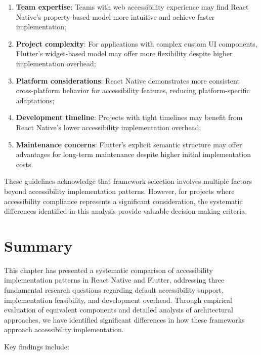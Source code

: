 \begin{enumerate}
    \item \textbf{Team expertise}: Teams with web accessibility experience may find React Native's property-based model more intuitive and achieve faster implementation;
    
    \item \textbf{Project complexity}: For applications with complex custom UI components, Flutter's widget-based model may offer more flexibility despite higher implementation overhead;
    
    \item \textbf{Platform considerations}: React Native demonstrates more consistent cross-platform behavior for accessibility features, reducing platform-specific adaptations;
    
    \item \textbf{Development timeline}: Projects with tight timelines may benefit from React Native's lower accessibility implementation overhead;
    
    \item \textbf{Maintenance concerns}: Flutter's explicit semantic structure may offer advantages for long-term maintenance despite higher initial implementation costs.
\end{enumerate}

These guidelines acknowledge that framework selection involves multiple factors beyond accessibility implementation patterns. However, for projects where accessibility compliance represents a significant consideration, the systematic differences identified in this analysis provide valuable decision-making criteria.

\section{Summary}
\label{sec:summary}

This chapter has presented a systematic comparison of accessibility implementation patterns in React Native and Flutter, addressing three fundamental research questions regarding default accessibility support, implementation feasibility, and development overhead. Through empirical evaluation of equivalent components and detailed analysis of architectural approaches, we have identified significant differences in how these frameworks approach accessibility implementation.

Key findings include:

